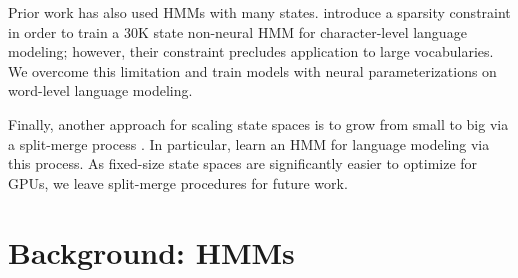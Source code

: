 \documentclass[11pt,a4paper]{article}
\begin{document}
Prior work has also used HMMs with many states.
\citet{dedieu2019learning} introduce a sparsity constraint
in order to train a 30K state non-neural HMM for character-level language modeling;
however, their constraint precludes application to large vocabularies.
We overcome this limitation and train models with 
neural parameterizations on word-level language modeling.

Finally, another approach for scaling state spaces is to
grow from small to big via a split-merge process
\citep{petrov2006splitmerge,huang2011thesis}.
In particular, \citet{huang2011thesis} learn an HMM for language modeling
via this process.
As fixed-size state spaces are significantly easier to optimize for 
GPUs, we leave split-merge procedures for future work. 

\section{Background: HMMs}
\end{document}
